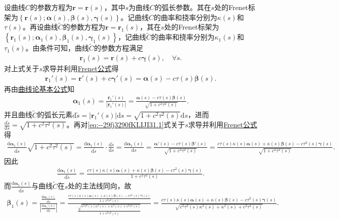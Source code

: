 \documentclass[../../main.tex]{subfiles}%
\begin{document}
\begin{solution}
设曲线$C$的参数方程为$\bm{r}=\bm{r}(s)$，其中$s$为曲线$C$的弧长参数。其在$s$处的Frenet标架为$\left\{ \bm{r}(s); \bm{\alpha}(s), \bm{\beta}(s), \bm{\gamma}(s) \right\}$。记曲线$C$的曲率和挠率分别为$\kappa(s)$和$\tau(s)$。再设曲线$\tilde{C}$的参数方程为$\bm{r}=\bm{r}_1(s)$，其在$s$处的Frenet标架为$\left\{ \bm{r}_1(s); \bm{\alpha}_1(s), \bm{\beta}_1(s), \bm{\gamma}_1(s) \right\}$，记曲线$\tilde{C}$的曲率和挠率分别为$\kappa_1(s)$和$\tau_1(s)$。由条件可知，曲线$\tilde{C}$的参数方程满足
\begin{align*}
\bm{r}_1(s) = \bm{r}(s) + c\bm{\gamma}(s),\quad \forall s.
\end{align*}
对上式关于$s$求导并利用\hyperref[theorem:微分几何-Frenet公式]{Frenet公式}得
\begin{align*}
\bm{r}_{1}'(s) = \bm{r}'(s) + c\bm{\gamma}'(s) = \bm{\alpha}(s) - c\tau(s)\bm{\beta}(s).
\end{align*}
再由\hyperref[theorem:曲线论基本公式]{曲线论基本公式}知
\begin{align}
\bm{\alpha}_1(s) = \frac{\bm{r}_{1}'(s)}{\left| \bm{r}_{1}'(s) \right|} = \frac{\bm{\alpha}(s) - c\tau(s)\bm{\beta}(s)}{\sqrt{1+c^2\tau^2(s)}}.
\label{eq:--29fj3290fKLIJI31.1}
\end{align}
并且曲线$\tilde{C}$的弧长元素$\mathrm{d}\tilde{s}=\left| \bm{r}_{1}'(s) \right|\mathrm{d}s=\sqrt{1+c^2\tau^2(s)}\mathrm{d}s$，进而$\frac{\mathrm{d}\tilde{s}}{\mathrm{d}s}=\sqrt{1+c^2\tau^2(s)}$。再对\eqref{eq:--29fj3290fKLIJI31.1}式关于$s$求导并利用\hyperref[theorem:微分几何-Frenet公式]{Frenet公式}得
\begin{align*}
\frac{\mathrm{d}\bm{\alpha}_1(s)}{\mathrm{d}\tilde{s}}\sqrt{1+c^2\tau^2(s)}=\frac{\mathrm{d}\bm{\alpha}_1(s)}{\mathrm{d}\tilde{s}}\cdot \frac{\mathrm{d}\tilde{s}}{\mathrm{d}s}=\frac{\mathrm{d}\bm{\alpha}_1(s)}{\mathrm{d}s}=\frac{\bm{\alpha}'(s) - c\tau(s)\bm{\beta}'(s)}{\sqrt{1+c^2\tau^2(s)}}=\frac{c\tau(s)\kappa(s)\bm{\alpha}(s) + \kappa(s)\bm{\beta}(s) - c\tau^2(s)\bm{\gamma}(s)}{\sqrt{1+c^2\tau^2(s)}}.
\end{align*}
因此
\begin{align*}
\frac{\mathrm{d}\bm{\alpha}_1(s)}{\mathrm{d}\tilde{s}}=\frac{c\tau(s)\kappa(s)\bm{\alpha}(s) + \kappa(s)\bm{\beta}(s) - c\tau^2(s)\bm{\gamma}(s)}{1+c^2\tau^2(s)}.
\end{align*}
而$\frac{\mathrm{d}\bm{\alpha}_1(s)}{\mathrm{d}\tilde{s}}$与曲线$\tilde{C}$在$s$处的主法线同向，故
\begin{align*}
\bm{\beta}_1(s) = \frac{\frac{\mathrm{d}\bm{\alpha}_1(s)}{\mathrm{d}\tilde{s}}}{\left| \frac{\mathrm{d}\bm{\alpha}_1(s)}{\mathrm{d}\tilde{s}} \right|}=\frac{\frac{c\tau(s)\kappa(s)\bm{\alpha}(s) + \kappa(s)\bm{\beta}(s) - c\tau^2(s)\bm{\gamma}(s)}{1+c^2\tau^2(s)}}{\frac{\sqrt{c^2\tau^2(s)\kappa^2(s) + \kappa^2(s) + c^2\tau^4(s)}}{1+c^2\tau^2(s)}}=\frac{c\tau(s)\kappa(s)\bm{\alpha}(s) + \kappa(s)\bm{\beta}(s) - c\tau^2(s)\bm{\gamma}(s)}{\sqrt{c^2\tau^2(s)\kappa^2(s) + \kappa^2(s) + c^2\tau^4(s)}}.

\end{align*}
\end{solution}
\end{document}
